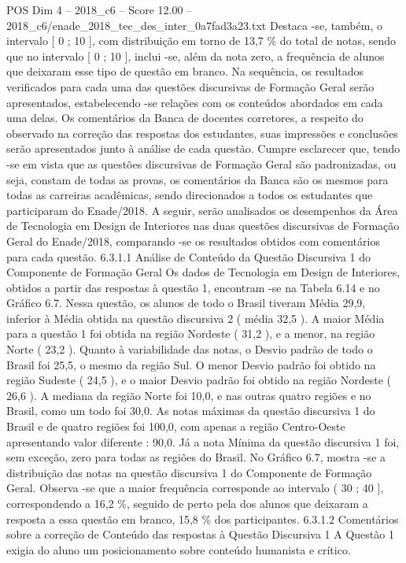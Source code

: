 \begin{textsample}{POS Dim 4 – 2018\_c6 – Score 12.00 – 2018\_c6/enade\_2018\_tec\_des\_inter\_0a7fad3a23.txt}
Destaca -se, também, o intervalo [ 0 ; 10 ], com distribuição em torno de 13,7 \% do total de notas, sendo que no intervalo [ 0 ; 10 ], inclui -se, além da nota zero, a frequência de alunos que deixaram esse tipo de questão em branco.
Na sequência, os resultados verificados para cada uma das questões discursivas de Formação Geral serão apresentados, estabelecendo -se relações com os conteúdos abordados em cada uma delas.
Os comentários da Banca de docentes corretores, a respeito do observado na correção das respostas dos estudantes, suas impressões e conclusões serão apresentados junto à análise de cada questão.
Cumpre esclarecer que, tendo -se em vista que as questões discursivas de Formação Geral são padronizadas, ou seja, constam de todas as provas, os comentários da Banca são os mesmos para todas as carreiras acadêmicas, sendo direcionados a todos os estudantes que participaram do Enade/2018.
A seguir, serão analisados os desempenhos da Área de Tecnologia em Design de Interiores nas duas questões discursivas de Formação Geral do Enade/2018, comparando -se os resultados obtidos com comentários para cada questão. 6.3.1.1 Análise de Conteúdo da Questão Discursiva 1 do Componente de Formação Geral Os dados de Tecnologia em Design de Interiores, obtidos a partir das respostas à questão 1, encontram -se na Tabela 6.14 e no Gráfico 6.7.
Nessa questão, os alunos de todo o Brasil tiveram Média 29,9, inferior à Média obtida na questão discursiva 2 ( média 32,5 ).
A maior Média para a questão 1 foi obtida na região Nordeste ( 31,2 ), e a menor, na região Norte ( 23,2 ).
Quanto à variabilidade das notas, o Desvio padrão de todo o Brasil foi 25,5, o mesmo da região Sul.
O menor Desvio padrão foi obtido na região Sudeste ( 24,5 ), e o maior Desvio padrão foi obtido na região Nordeste ( 26,6 ).
A mediana da região Norte foi 10,0, e nas outras quatro regiões e no Brasil, como um todo foi 30,0.
As notas máximas da questão discursiva 1 do Brasil e de quatro regiões foi 100,0, com apenas a região Centro-Oeste apresentando valor diferente : 90,0.
Já a nota Mínima da questão discursiva 1 foi, sem exceção, zero para todas as regiões do Brasil.
No Gráfico 6.7, mostra -se a distribuição das notas na questão discursiva 1 do Componente de Formação Geral.
Observa -se que a maior frequência corresponde ao intervalo ( 30 ; 40 ], correspondendo a 16,2 \%, seguido de perto pela dos alunos que deixaram a resposta a essa questão em branco, 15,8 \% dos participantes. 6.3.1.2 Comentários sobre a correção de Conteúdo das respostas à Questão Discursiva 1 A Questão 1 exigia do aluno um posicionamento sobre conteúdo humanista e crítico.

\end{textsample}
